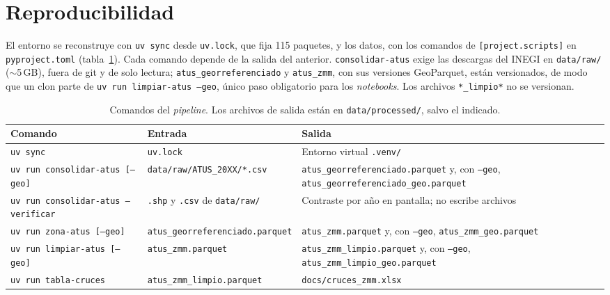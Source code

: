 \section{Reproducibilidad}\label{app:reproducibilidad}

El entorno se reconstruye con \texttt{uv sync} desde \texttt{uv.lock}, que fija
115 paquetes, y los datos, con los comandos de \texttt{[project.scripts]} en
\texttt{pyproject.toml} (tabla~\ref{tab:comandos}). Cada comando depende de la
salida del anterior. \texttt{consolidar-atus} exige las descargas del INEGI en
\texttt{data/raw/} ($\sim$5\,GB), fuera de git y de solo lectura;
\texttt{atus\_georreferenciado} y \texttt{atus\_zmm}, con sus versiones
GeoParquet, están versionados, de modo que un clon parte de
\texttt{uv run limpiar-atus --geo}, único paso obligatorio para los
\emph{notebooks}. Los archivos \texttt{*\_limpio*} no se versionan.

\begin{table}
	\centering\footnotesize
	\caption{Comandos del \emph{pipeline}. Los archivos de salida están en
		\texttt{data/processed/}, salvo el indicado.}
	\label{tab:comandos}
	\begin{tabular}{@{}>{\raggedright\arraybackslash}p{}>{\raggedright\arraybackslash}p{}>{\raggedright\arraybackslash}p{}@{}}
		\toprule
		Comando                                   & Entrada                                    & Salida                                                   \\
		\midrule
		\texttt{uv sync}                          & \texttt{uv.lock}                           & Entorno virtual \texttt{.venv/}                          \\
		\texttt{uv run consolidar-atus [--geo]}   & \texttt{data/raw/ATUS\_20XX/*.csv}         & \texttt{atus\_georreferenciado.parquet} y, con
		\texttt{--geo}, \texttt{atus\_georreferenciado\_geo.parquet}                                                                                          \\
		\texttt{uv run consolidar-atus --verificar} & \texttt{.shp} y \texttt{.csv} de \texttt{data/raw/} & Contraste por año en pantalla; no escribe archivos       \\
		\texttt{uv run zona-atus [--geo]}         & \texttt{atus\_georreferenciado.parquet}    & \texttt{atus\_zmm.parquet} y, con \texttt{--geo},
		\texttt{atus\_zmm\_geo.parquet}                                                                                                                       \\
		\texttt{uv run limpiar-atus [--geo]}      & \texttt{atus\_zmm.parquet}                 & \texttt{atus\_zmm\_limpio.parquet} y, con \texttt{--geo},
		\texttt{atus\_zmm\_limpio\_geo.parquet}                                                                                                               \\
		\texttt{uv run tabla-cruces}              & \texttt{atus\_zmm\_limpio.parquet}         & \texttt{docs/cruces\_zmm.xlsx}                           \\
		\bottomrule
	\end{tabular}
\end{table}

